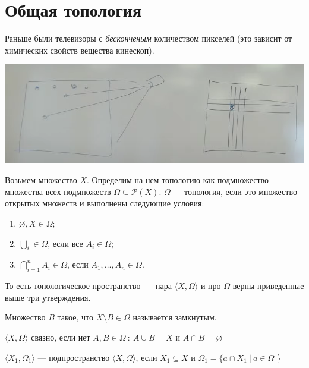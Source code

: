 \section{Общая топология}

Раньше были телевизоры с \textit{бесконченым} количеством пикселей (это зависит от химических свойств вещества кинескоп).

\begin{center}
    \includegraphics[scale=0.8]{img/topology_tv_example}
\end{center}

Возьмем множество $X$. Определим на нем топологию как подмножество множества всех подмножеств
$\Omega \subseteq \mathcal{P}(X)$. $\Omega$ --- топология, если это множество открытых множеств и выполнены следующие условия:
\begin{enumerate}
    \item $\varnothing, X \in \Omega$;
    \item $\bigcup\limits_i \in \Omega$, если все $A_i \in \Omega$;
    \item $\bigcap\limits_{i = 1} ^ n A_i \in \Omega$, если $A_1, \dots, A_n \in \Omega$.
\end{enumerate}

То есть топологическое пространство~--- пара $\langle X, \Omega \rangle$ и про $\Omega$ верны приведенные выше три утверждения.

\begin{definition}
 Множество $B$ такое, что $X \setminus B \in \Omega$ называется замкнутым.
\end{definition}

\begin{definition}
     $\langle X, \Omega \rangle$ связно, если нет $A, B \in \Omega ~:~ A \cup B = X$ и $A \cap B = \varnothing$
\end{definition}
    
\begin{definition}[Подпространство]
    $\langle X_1, \Omega_1 \rangle $ --- подпространство $\langle X, \Omega \rangle$, если
    $X_1 \subseteq X$ и $\Omega_1 = \{ a \cap X_1 ~|~ a \in \Omega$ \}  
\end{definition}

